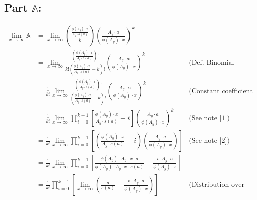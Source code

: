 \documentclass{article}
\theoremstyle{definition}
\begin{document}
\subsection*{Part $\mathbb{A}$:}
\begin{align*} 
    \lim_{x \to \infty}\mathbb{A} & = \lim_{x \to \infty}{\frac{\phi(A_y) \cdot x}{A_y \cdot s(a)} \choose k } \left(\frac{A_y \cdot a}{\phi(A_y) \cdot x}\right)^k                                                                                                                                     \\
                                  & = \lim_{x \to \infty} \frac{\left(\frac{\phi(A_y) \cdot x}{A_y \cdot s(a)}\right)!}{k!\left(\frac{\phi(A_y) \cdot x}{A_y \cdot s(a)} - k \right)!} \left(\frac{A_y \cdot a}{\phi(A_y) \cdot x}\right)^k           & \text{(Def. Binomial Coefficient)}              \\
                                  & = \frac{1}{k!}\lim_{x \to \infty} \frac{\left(\frac{\phi(A_y) \cdot x}{A_y \cdot s(a)}\right)!}{\left(\frac{\phi(A_y) \cdot x}{A_y \cdot s(a)} - k \right)!} \left(\frac{A_y \cdot a}{\phi(A_y) \cdot x}\right)^k & \text{(Constant coefficient limit law)}         \\
                                  & = \frac{1}{k!}\lim_{x \to \infty} \prod_{i = 0}^{k-1} \left[\frac{\phi(A_y) \cdot x}{A_y \cdot s(a)} - i \right ]\left(\frac{A_y \cdot a}{\phi(A_y) \cdot x}\right)^k                                             & \text{(See note [1])}                           \\
                                  & = \frac{1}{k!}\lim_{x \to \infty} \prod_{i = 0}^{k-1} \left[\left(\frac{\phi(A_y) \cdot x}{A_y \cdot s(a)} - i\right)\left(\frac{A_y \cdot a}{\phi(A_y) \cdot x}\right) \right]                                   & \text{(See note [2])}                           \\
                                  & = \frac{1}{k!}\lim_{x \to \infty} \prod_{i = 0}^{k-1} \left[\frac{\phi(A_y) \cdot A_y  \cdot x \cdot a}{ \phi(A_y) \cdot A_y \cdot   x \cdot s(a)} - \frac{i \cdot A_y \cdot a }{\phi(A_y) \cdot x}  \right]                                                        \\
                                  & = \frac{1}{k!} \prod_{i = 0}^{k-1} \left[\lim_{x \to \infty} \left(   \frac{a}{ s(a)} - \frac{i \cdot A_y \cdot a }{\phi(A_y) \cdot x} \right) \right]                                                            & \text{(Distribution over product limit law)}    \\

\end{align*}
\end{document}
